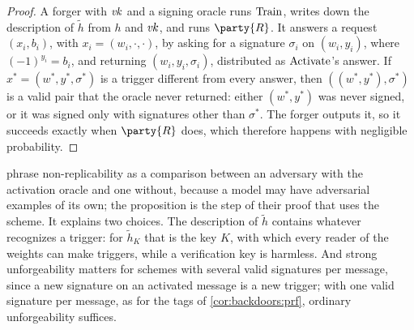 \begin{refsection}
\begin{proof}
A forger with $\mathit{vk}$ and a signing oracle runs $\mathrm{Train}$, writes down the description of $\tilde h$ from $h$ and $\mathit{vk}$, and runs $\party{R}$. It answers a request $(x_i,b_i)$, with $x_i=(w_i,\cdot,\cdot)$, by asking for a signature $\sigma_i$ on $(w_i,y_i)$, where $(-1)^{y_i}=b_i$, and returning $(w_i,y_i,\sigma_i)$, distributed as $\mathrm{Activate}$'s answer. If $x^*=(w^*,y^*,\sigma^*)$ is a trigger different from every answer, then $((w^*,y^*),\sigma^*)$ is a valid pair that the oracle never returned: either $(w^*,y^*)$ was never signed, or it was signed only with signatures other than $\sigma^*$. The forger outputs it, so it succeeds exactly when $\party{R}$ does, which therefore happens with negligible probability.
\end{proof}

\Textcite[Definition~4.7]{GoldwasserEtAl2022} phrase non-replicability as a comparison between an adversary with the activation oracle and one without, because a model may have adversarial examples of its own; the proposition is the step of their proof that uses the scheme. It explains two choices. The description of $\tilde h$ contains whatever recognizes a trigger: for $\tilde h_K$ that is the key $K$, with which every reader of the weights can make triggers, while a verification key is harmless. And strong unforgeability matters for schemes with several valid signatures per message, since a new signature on an activated message is a new trigger; with one valid signature per message, as for the tags of \cref{cor:backdoors:prf}, ordinary unforgeability suffices.


\end{refsection}
